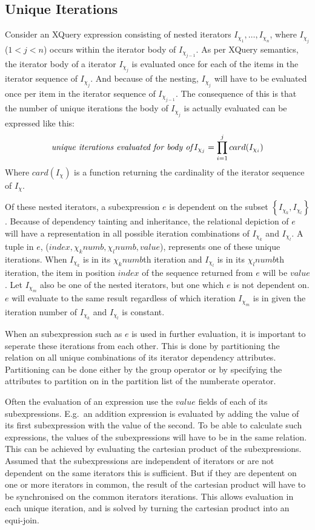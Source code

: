 \subsection{Unique Iterations}
\label{sect:trans:TD:implic}
Consider an XQuery expression consisting of nested iterators $I_{\chi_1},\ldots,I_{\chi_n}$, where $I_{\chi_j}$
($1<j<n$) occurs within the iterator body of $I_{\chi_{j-1}}$. As per XQuery semantics, the iterator body of a
iterator $I_{\chi_j}$ is evaluated once for each of the items in the iterator sequence of $I_{\chi_j}$. And because
of the nesting, $I_{\chi_j}$ will have to be evaluated once per item in the iterator sequence of $I_{\chi_{j-1}}$.
The consequence of this is that the number of unique iterations the body of $I_{\chi_j}$ is actually evaluated can
be expressed like this: 
\begin{equation*}
\mbox{\textit{unique iterations evaluated for body of}}I_{\chi_j}=\displaystyle \prod_{i=1}^{j}card(I_{\chi_i})
\end{equation*}  
Where $card(I_{\chi})$ is a function returning the cardinality of the iterator sequence of $I_{\chi}$.

Of these nested iterators, a subexpression $e$ is dependent on the subset
$\left\{I_{\chi_k},I_{\chi_l}\right\}$. Because of dependency tainting and inheritance, the relational
depiction of $e$ will have a representation in all possible iteration
combinations of $I_{\chi_k}$ and $I_{\chi_l}$. A tuple in $e$, ($index, \chi_k{numb},\chi_l{numb}, value$), represents one of these unique
iterations. When $I_{\chi_k}$ is in its $\chi_k{numb}$th iteration and $I_{\chi_l}$ is in its $\chi_l{numb}$th
iteration, the item in position $index$ of the sequence returned from $e$ will be $value$. Let $I_{\chi_m}$ also
be one of the nested iterators, but one which $e$ is not dependent on. $e$ will evaluate to the same result
regardless of which iteration $I_{\chi_m}$ is in given the iteration number of
$I_{\chi_k}$ and $I_{\chi_l}$ is constant.

When an subexpression such as $e$ is used in further evaluation, it is important to seperate these iterations from
each other. This is done by partitioning the relation on all unique combinations of its iterator dependency
attributes. Partitioning can be done either by the \textsf{group} operator or by specifying the attributes to
partition on in the partition list of the \textsf{numberate} operator.

Often the evaluation of an expression use the $value$ fields of each of its subexpressions. E.g.\ an addition
expression is evaluated by adding the value of its first subexpression with the value of the second. To be able to
calculate such expressions, the values of the subexpressions will have to be in the same relation. This can be
achieved by evaluating the cartesian product of the subexpressions. Assumed that the subexpressions are
independent of iterators or are not dependent on the same iterators this is sufficient. But if they are depentent
on one or more iterators in common, the result of the cartesian product will have to be synchronised on the common
iterators iterations. This allows evaluation in each unique iteration, and is solved by turning the cartesian
product into an equi-join.

